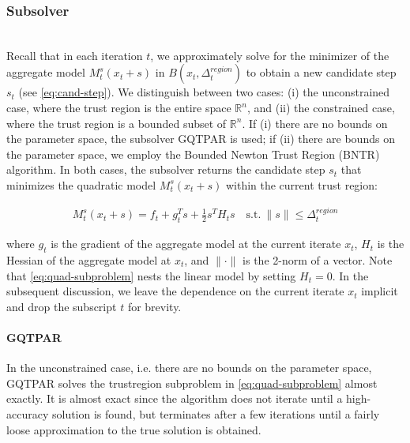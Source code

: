 \subsubsection{Subsolver}
\label{subsubsec:subsolver}
\hfill\\

\noindent Recall that in each iteration $t$, we approximately solve for the minimizer of the aggregate model
$M_{t}^{s} (x_t + s)$ in $B(x_t, \Delta_t^{region})$ to obtain a new candidate step $s_t$ (see \ref{eq:cand-step}).
We distinguish between two cases: (i) the unconstrained case, where the trust region is the entire space $\mathbb{R}^n$,
and (ii) the constrained case, where the trust region is a bounded subset of $\mathbb{R}^n$.
If (i) there are no bounds on the parameter space, the subsolver GQTPAR is used; if (ii) there
are bounds on the parameter space, we employ the Bounded Newton Trust Region (BNTR) algorithm.
In both cases, the subsolver returns the candidate step $s_t$ that minimizes the quadratic model $M_{t}^{s} (x_t + s)$
within the current trust region:

\begin{align}
    M_{t}^{s} (x_t + s) = f_t + g_t^T s + \frac{1}{2} s^T H_t s \quad \text{s.t.} \ \lVert s \rVert \leq \Delta^{region}_{t}
    \label{eq:quad-subproblem}
\end{align}

where $g_t$ is the gradient of the aggregate model at the current iterate $x_t$, $H_t$ is the 
Hessian of the aggregate model at $x_t$, and $\lVert\cdot\rVert$ is the 2-norm of a vector. 
Note that \ref{eq:quad-subproblem} nests the linear model by setting $H_t=0$. 
In the subsequent discussion, we leave the dependence on the current iterate $x_t$ implicit
and drop the subscript $t$ for brevity. %




\paragraph{GQTPAR}

In the unconstrained case, i.e. there are no bounds on the parameter space, GQTPAR solves the trustregion
subproblem in \ref{eq:quad-subproblem} almost exactly. It is almost exact since the algorithm does not iterate until a high-accuracy solution is found, but terminates after a few iterations until a fairly loose approximation to the true solution is obtained.


